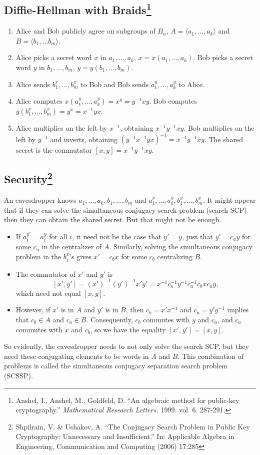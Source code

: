 \documentclass[11pt]{article}
\begin{document}
\subsection*{Diffie-Hellman with Braids\footnote{Anshel, I., Anshel, M., Goldfeld, D. ``An algebraic method for public-key cryptography.'' \textit{Mathematical Research Letters.} 1999. vol. 6. 287-291.}}
\begin{enumerate}
	\item Alice and Bob publicly agree on subgroups of $B_n$,  $A = \langle a_1, \ldots, a_k\rangle$ and $B = \langle b_1, \ldots b_m\rangle$.
	\item Alice picks a secret word $x$ in $a_1, \ldots, a_k$, $x = x(a_1, \ldots, a_k)$. Bob picks a secret word $y$ in $b_1, \ldots, b_m$, $y = y(b_1, \ldots, b_m)$.
	\item Alice sends $b_1^x, \ldots, b_m^x$ to Bob and Bob sends $a_1^y, \ldots, a_k^y$ to Alice.
	\item Alice computes $x(a_1^y, \ldots, a_k^y) = x^y = y^{-1}xy$. Bob computes $y(b_1^x, \ldots, b_m^x) = y^x = x^{-1}yx$.
	\item Alice multiplies on the left by $x^{-1}$, obtaining $x^{-1}y^{-1}xy$. Bob multiplies on the left by $y^{-1}$ and inverts, obtaining $(y^{-1}x^{-1}yx)^{-1} = x^{-1}y^{-1}xy$. The shared secret is the commutator $[x,y] = x^{-1}y^{-1}xy$.
\end{enumerate}

\subsection*{Security\footnote{Shpilrain, V. \& Ushakov, A. ``The Conjugacy Search Problem in Public Key Cryptography: Unnecessary and Insufficient.'' In: Applicable Algebra in Engineering, Communication and Computing (2006) 17:285}}
An eavesdropper knows $a_1, \ldots, a_k, b_1, \ldots, b_m$ and $a_1^y, \ldots, a_k^y, b_1^x, \ldots, b_m^x$. It might appear that if they can solve the simultaneous conjugacy search problem (search SCP) then they can obtain the shared secret. But that might not be enough.
\begin{itemize}
	\item If $a_i^{y'} = a_i^y$ for all $i$, it need not be the case that $y' = y$, just that $y' = c_ay$ for some $c_a$ in the centralizer of $A$. Similarly, solving the simultaneous conjugacy problem in the $b_j^x$'s gives $x' = c_bx$ for some $c_b$ centralizing $B$.
	\item The commutator of $x'$ and $y'$ is
	\[
	[x',y'] = (x')^{-1}(y')^{-1}x'y' = x^{-1}c_b^{-1}y^{-1}c_a^{-1}c_bxc_ay,
	\]
	which need not equal $[x,y]$.
	\item However, if $x'$ is in $A$ and $y'$ is in $B$, then $c_b = x'x^{-1}$ and $c_a = y'y^{-1}$ implies that $c_b \in A$ and $c_a\in B$. Consequently, $c_b$ commutes with $y$ and $c_a$, and $c_a$ commutes with $x$ and $c_b$, so we have the equality $[x',y'] = [x,y]$.
\end{itemize}
So evidently, the eavesdropper needs to not only solve the search SCP, but they need these conjugating elements to be words in $A$ and $B$. This combination of problems is called the simultaneous conjugacy separation search problem (SCSSP). 
\end{document}
